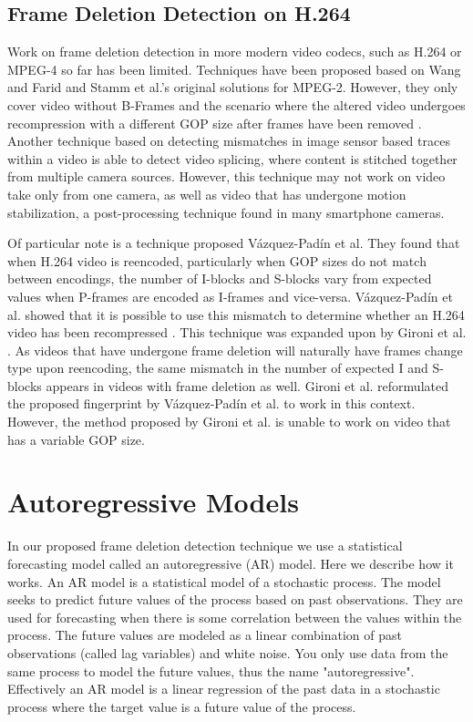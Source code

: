 \subsection{Frame Deletion Detection on H.264}

Work on frame deletion detection in more modern video codecs, such as H.264 or MPEG-4 so far has been limited. Techniques have been proposed based on Wang and Farid and Stamm et al.'s original solutions for MPEG-2. However, they only cover video without B-Frames and the scenario where the altered video undergoes recompression with a different GOP size after frames have been removed \cite{Liu}. Another technique based on detecting mismatches in image sensor based traces within a video \cite{Mandelli} is able to detect video splicing, where content is stitched together from multiple camera sources. However, this technique may not work on video take only from one camera, as well as video that has undergone motion stabilization, a post-processing technique found in many smartphone cameras.

Of particular note is a technique proposed V\'azquez-Pad\'in et al. They found that when H.264 video is reencoded, particularly when GOP sizes do not match between encodings, the number of I-blocks and S-blocks vary from expected values when P-frames are encoded as I-frames and vice-versa. V\'azquez-Pad\'in et al. showed that it is possible to use this mismatch to determine whether an H.264 video has been recompressed \cite{Vazquez}. This technique was expanded upon by Gironi et al. \cite{barni}. As videos that have undergone frame deletion will naturally have frames change type upon reencoding, the same mismatch in the number of expected I and S-blocks appears in videos with frame deletion as well. Gironi et al. reformulated the proposed fingerprint by V\'azquez-Pad\'in et al. to work in this context. However, the method proposed by Gironi et al. is unable to work on video that has a variable GOP size.

\section{Autoregressive Models}

In our proposed frame deletion detection technique we use a statistical forecasting model called an autoregressive (AR) model. Here we describe how it works. An AR model is a statistical model of a stochastic process. The model seeks to predict future values of the process based on past observations. They are used for forecasting when there is some correlation between the values within the process. The future values are modeled as a linear combination of past observations (called lag variables) and white noise. You only use data from the same process to model the future values, thus the name "autoregressive". Effectively an AR model is a linear regression of the past data in a stochastic process where the target value is a future value of the process.

